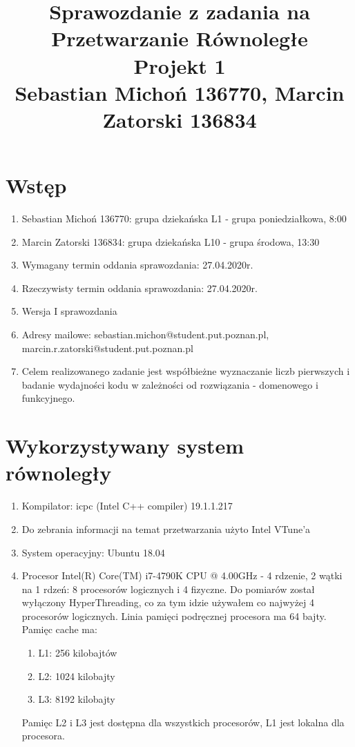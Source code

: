 \documentclass[12pt]{article}
\begin{document}
\title{Sprawozdanie z zadania na Przetwarzanie Równoległe\\
\large Projekt 1\\
\large Sebastian Michoń 136770, Marcin Zatorski 136834}
\date{\vspace{-10ex}}
\maketitle

\section{Wstęp}
\begin {enumerate}
\item Sebastian Michoń 136770: grupa dziekańska L1 - grupa poniedziałkowa, 8:00
\item Marcin Zatorski 136834: grupa dziekańska L10 - grupa środowa, 13:30
\item Wymagany termin oddania sprawozdania: 27.04.2020r.
\item Rzeczywisty termin oddania sprawozdania: 27.04.2020r.
\item Wersja I sprawozdania
\item Adresy mailowe: sebastian.michon@student.put.poznan.pl, marcin.r.zatorski@student.put.poznan.pl
\item Celem realizowanego zadanie jest współbieżne wyznaczanie liczb pierwszych i badanie wydajności kodu w zależności od rozwiązania - domenowego i funkcyjnego.
\end {enumerate}

\section{Wykorzystywany system równoległy}
\begin {enumerate}
	\item Kompilator: icpc (Intel C++ compiler) 19.1.1.217
	\item Do zebrania informacji na temat przetwarzania użyto Intel VTune'a
	\item System operacyjny: Ubuntu 18.04
	\item Procesor Intel(R) Core(TM) i7-4790K CPU @ 4.00GHz - 4 rdzenie, 2 wątki na 1 rdzeń: 8 procesorów logicznych i 4 fizyczne. Do pomiarów został wyłączony HyperThreading, co za tym idzie używałem co najwyżej 4 procesorów logicznych. Linia pamięci podręcznej procesora ma 64 bajty. Pamięc cache ma: 
	\begin{enumerate}
		\item L1: 256 kilobajtów
		\item L2: 1024 kilobajty
		\item L3: 8192 kilobajty
	\end{enumerate}
	Pamięc L2 i L3 jest dostępna dla wszystkich procesorów, L1 jest lokalna dla procesora.
	
\end {enumerate}
\end{document}
